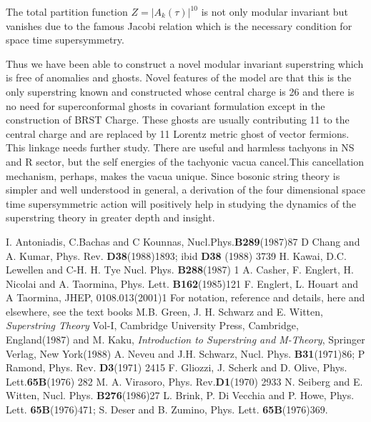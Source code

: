 \documentclass[a4paper,showpacs,preprintnumbers,amsmath,amssymb]{revtex4}
\begin{document}
The total partition function $Z=|A_k(\tau)|^{10}$ is not only modular invariant but 
vanishes due to the famous Jacobi relation which is the necessary condition for 
space time supersymmetry.

Thus we have been able to construct a novel modular invariant superstring which 
is free of anomalies and ghosts. Novel features of the model are that this is the only
superstring known and constructed whose central charge is 26 and  there is no need for
superconformal ghosts in covariant formulation except in the construction of BRST Charge.
These ghosts are usually contributing 11 to the central charge and are replaced by 11 
Lorentz metric ghost of vector fermions. This linkage needs further study. There are 
useful and harmless tachyons in NS and R sector, but the self energies of the tachyonic 
vacua cancel.This cancellation mechanism, perhaps, makes the vacua unique.
Since bosonic string theory is simpler and well understood in general, a derivation of the 
four dimensional space time supersymmetric action will positively help in studying the 
dynamics of the superstring theory in greater depth and insight.


\begin{thebibliography}{99}
 I. Antoniadis, C.Bachas and C Kounnas, Nucl.Phys.{\bf B289}(1987)87
 D Chang and A. Kumar, Phys. Rev. {\bf D38}(1988)1893; ibid {\bf D38}
(1988) 3739
 H. Kawai, D.C. Lewellen and C-H. H. Tye Nucl. Phys. {\bf B288}(1987) 1
 A. Casher, F. Englert, H. Nicolai and A. Taormina, 
Phys. Lett. {\bf B162}(1985)121 
 F. Englert, L. Houart and A Taormina, JHEP, 0108.013(2001)1
 For notation, reference and details, here and elsewhere, see the 
text books M.B. Green, J. H. Schwarz and E. Witten,\\ 
{\it Superstring Theory} Vol-I, Cambridge University Press, Cambridge, England(1987) and 
M. Kaku, {\it Introduction to Superstring and M-Theory}, Springer Verlag, New York(1988)
 A. Neveu and J.H. Schwarz, Nucl. Phys. {\bf B31}(1971)86; P Ramond,
Phys. Rev. {\bf D3}(1971) 2415
 F. Gliozzi, J. Scherk and D. Olive, Phys. Lett.{\bf 65B}(1976) 282
 M. A. Virasoro, Phys. Rev.{\bf D1}(1970) 2933
 N. Seiberg and E. Witten, Nucl. Phys. {\bf B276}(1986)27
 L. Brink, P. Di Vecchia and P. Howe, Phys. Lett. {\bf 65B}(1976)471;
S. Deser and B. Zumino, Phys. Lett. {\bf 65B}(1976)369.
\end{thebibliography}
\end{document}
